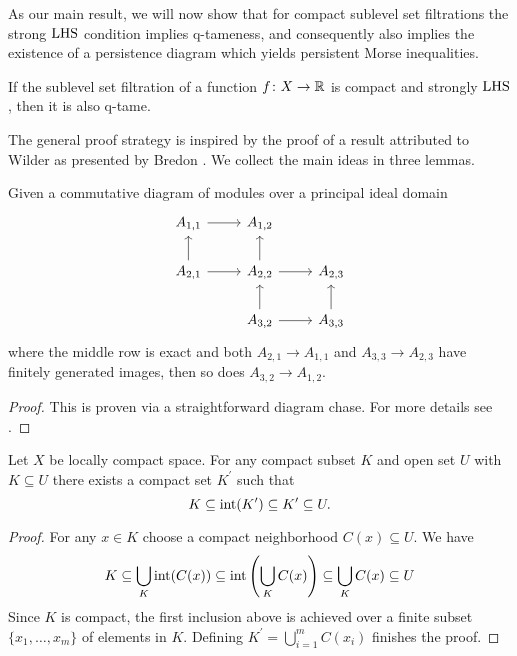 As our main result, we will now show that for compact sublevel set filtrations the strong $\mathrm{LHS}$ condition implies \mbox{q-tameness}, and consequently also implies the existence of a persistence diagram which yields persistent Morse inequalities.

\begin{thm} \label{t:strong local connectedness implies q-tameness}
	If the sublevel set filtration of a function $f \colon X \to \mathbb{R}$ is compact and strongly $\mathrm{LHS}$, then it is also q-tame.
\end{thm}

The general proof strategy is inspired by the proof of a result attributed to Wilder as presented by Bredon \cite[Section II.17]{Bredon.1997}.
We collect the main ideas in three lemmas.

\begin{lem} \label{l:commutative algebra}
	Given a commutative diagram of modules over a principal ideal domain
	\begin{equation*}
	\begin{tikzcd}
	A_{1,1} \arrow[r] & A_{1,2} & \\
	A_{2,1} \arrow[r] \arrow[u] & A_{2,2} \arrow[r] \arrow[u] & A_{2,3} \\
	& A_{3,2} \arrow[r] \arrow[u] & A_{3,3} \arrow[u]
	\end{tikzcd}
	\end{equation*}
	where the middle row is exact and both $A_{2,1} \to A_{1,1}$ and $A_{3,3} \to A_{2,3}$ have finitely generated images, then so does $A_{3,2} \to A_{1,2}$.
\end{lem}

\begin{proof}
	This is proven via a straightforward diagram chase.
For more details see \cite[Lemma II.17.3]{Bredon.1997}.
\end{proof}

\begin{lem} \label{l:neighborhood third}
	Let $X$ be locally compact space.
	For any compact subset $K$ and open set $U$ with $K \subseteq U$ there exists a compact set $K^\prime$ such that
	\begin{equation*}
	K \subseteq \operatorname{int}(K^\prime) \subseteq K^\prime \subseteq U.
	\end{equation*}
\end{lem}

\begin{proof}
	For any $x \in K$ choose a compact neighborhood $C(x) \subseteq U$.
	We have
	\begin{equation*}
	K \subseteq \bigcup_K \operatorname{int}(C(x)) \subseteq \operatorname{int}\left(\bigcup_K C(x)\right) \subseteq \bigcup_K C(x) \subseteq U
	\end{equation*}
	Since $K$ is compact, the first inclusion above is achieved over a finite subset $\{x_1, \dots, x_m\}$ of elements in $K$.
	Defining $K^\prime = \bigcup_{i=1}^m C(x_i)$ finishes the proof.
\end{proof}

